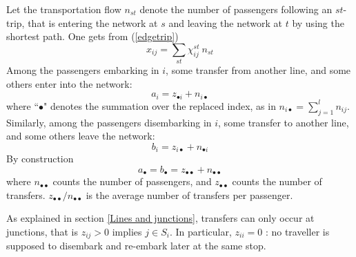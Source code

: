 \documentclass{bmcart}
\begin{document}
\vspace*{0.1cm}

Let the transportation flow $n_{st}$ denote the number of passengers following an $st$-trip, that is entering the network at $s$ and leaving the network at $t$ by using the shortest path. One gets from (\ref{edgetrip}) 
\begin{equation}
\label{equationGG}
x_{ij}=\sum_{st}\chi_{ij}^{st}\:  n_{st}
\end{equation}
Among the passengers embarking in $i$, some transfer from another line, and some others enter into the network: 
\begin{equation}
\label{entrer}
a_i=z_{\bullet i}+n_{i\bullet}
\end{equation}
where  ``$\bullet$" denotes the summation over the replaced index, as in $n_{i\bullet}=\sum_{j=1}^l n_{ij}$. Similarly, among the passengers disembarking in $i$, some transfer to another line, and some others leave the network: 
\begin{equation}
\label{sortir}
b_i=z_{i\bullet}+n_{\bullet i}
\end{equation}
By construction
\begin{displaymath}
a_{\bullet}=b_{\bullet}=z_{\bullet\bullet}+n_{\bullet\bullet}
\end{displaymath}
where $n_{\bullet\bullet}$ counts the number of passengers, and $z_{\bullet\bullet}$ counts the number of transfers. $z_{\bullet\bullet}/n_{\bullet\bullet}$  is the average number of transfers per passenger. 

\vspace*{0.1cm}



As explained in section \ref{Lines and junctions}, transfers can only occur at junctions, that is $z_{ij}>0$ implies $j\in S_i$. In particular,  $z_{ii}=0$ : no traveller is supposed to disembark and re-embark later at the same stop. 


 
\end{document}
